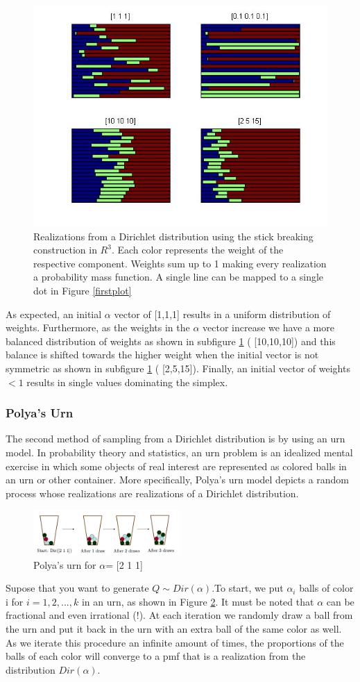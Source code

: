\documentclass [twoside,hidelinks]{article}
\begin{document}
\begin{figure} [!h]
    \centerline{\includegraphics [width=.55\textwidth]{stickBreaking}}
    \caption{Realizations from a Dirichlet distribution using the stick breaking construction in $R^3$. Each color represents the weight of the respective component. Weights sum up to 1 making every realization a probability mass function. A single line can be mapped to a single dot in Figure  \ref{firstplot}  }
\label{stickR3}
\end{figure}


As expected, an initial $\alpha$ vector of  [1,1,1] results in a uniform distribution of weights. Furthermore, as the weights in the $\alpha$ vector increase we have a more balanced distribution of weights as shown in subfigure \ref{stickR3} ( [10,10,10]) and this balance is shifted towards the higher weight when the initial vector is not symmetric as shown in subfigure \ref{stickR3} ( [2,5,15]). Finally, an initial vector of weights $<1$ results in single values dominating the simplex.
\subsubsection{Polya's Urn}

The second method of sampling from a Dirichlet distribution is by using an urn model. In probability theory and statistics, an urn problem is an idealized mental exercise in which some objects of real interest are represented as colored balls in an urn or other container. More specifically, Polya's urn model depicts a random process whose realizations are realizations of a Dirichlet distribution.

\begin{figure} [!h]
    \centerline{\includegraphics [width=0.5\textwidth]{urn}}
	\caption{Polya's urn for $\alpha$= [2 1 1] }
	\label{polysurn}
\end{figure}
Supose that you want to generate $Q \sim Dir ( \alpha ) $.To start, we put $\alpha_i$ balls of color i for $i=1,2,...,k$ in an urn, as shown in Figure \ref{polysurn}. It must be noted that $\alpha$ can be fractional and even irrational (!). At each iteration we randomly draw a ball from the urn and put it back in the urn with an extra ball of the same color as well. As we iterate this procedure an infinite amount of times, the proportions of the balls of each color will converge to a pmf that is a realization from the distribution $Dir (\alpha)$.
\end{document}
